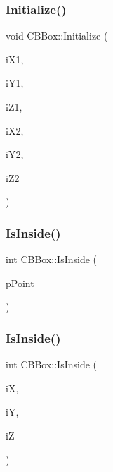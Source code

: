 \subsubsection{\texorpdfstring{Initialize()}{Initialize()}\hspace{0.1cm}{\footnotesize\ttfamily [2/2]}}
{\footnotesize\ttfamily void C\+B\+Box\+::\+Initialize (\begin{DoxyParamCaption}\item[{int}]{i\+X1,  }\item[{int}]{i\+Y1,  }\item[{int}]{i\+Z1,  }\item[{int}]{i\+X2,  }\item[{int}]{i\+Y2,  }\item[{int}]{i\+Z2 }\end{DoxyParamCaption})}

\mbox{\label{classCBBox_a82263f5b6a58c13943b99140f664ddf0}} 
\subsubsection{\texorpdfstring{IsInside()}{IsInside()}\hspace{0.1cm}{\footnotesize\ttfamily [1/4]}}
{\footnotesize\ttfamily int C\+B\+Box\+::\+Is\+Inside (\begin{DoxyParamCaption}\item[{\mbox{\hyperlink{classCPoint}{C\+Point}} $\ast$}]{p\+Point }\end{DoxyParamCaption})}

\mbox{\label{classCBBox_ab8c8772201f6864c1fdf7a4bb78bdd50}} 
\subsubsection{\texorpdfstring{IsInside()}{IsInside()}\hspace{0.1cm}{\footnotesize\ttfamily [2/4]}}
{\footnotesize\ttfamily int C\+B\+Box\+::\+Is\+Inside (\begin{DoxyParamCaption}\item[{int}]{iX,  }\item[{int}]{iY,  }\item[{int}]{iZ }\end{DoxyParamCaption})}

